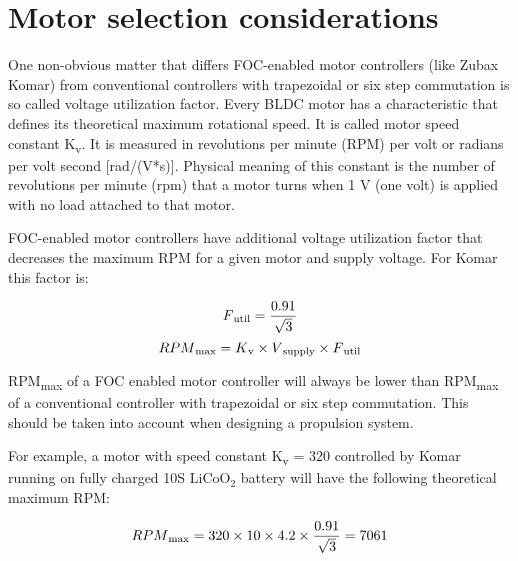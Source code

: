 \chapter{Motor selection considerations}
One non-obvious matter that differs FOC-enabled motor controllers (like Zubax Komar)
from conventional controllers with trapezoidal or six step commutation
is so called voltage utilization factor.
Every BLDC motor has a characteristic that defines its theoretical maximum rotational speed.
It is called  motor speed constant K\textsubscript{v}.
It is measured in revolutions per minute (RPM) per volt or radians per volt second [rad/(V*s)].
Physical meaning of this constant is the number of revolutions per minute (rpm) that a motor turns when 1 V (one volt)
is applied with no load attached to that motor.

FOC-enabled motor controllers have additional voltage utilization factor that decreases the maximum RPM
for a given motor and supply voltage. For Komar this factor is:

\[F\textsubscript{util} = \frac{0.91}{\sqrt{3}}\]
\[RPM\textsubscript{max} = K\textsubscript{v} \times V\textsubscript{supply} \times F\textsubscript{util}\]

RPM\textsubscript{max} of a FOC enabled motor controller will always be lower than RPM\textsubscript{max} 
of a conventional controller with trapezoidal or six step commutation. This should be taken into account 
when designing a propulsion system.

For example, a motor with speed constant K\textsubscript{v} = 320 controlled by Komar
running on fully charged 10S $\text{LiCoO}_\text{2}$ battery will have the following theoretical maximum RPM:

\[RPM\textsubscript{max} = 320 \times 10 \times 4.2 \times \frac{0.91}{\sqrt{3}} = 7061\]